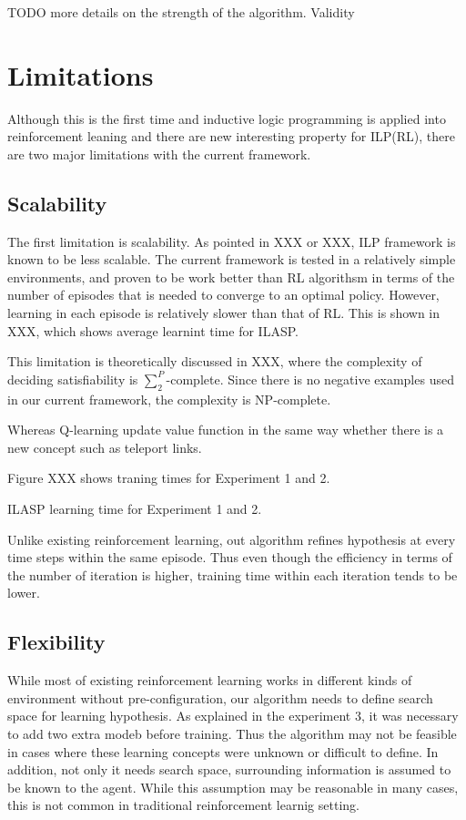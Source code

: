 TODO more details on the strength of the algorithm. 
Validity

\section{Limitations}

Although this is the first time and inductive logic programming is applied into reinforcement leaning and there are new interesting property for ILP(RL),
there are two major limitations with the current framework.

\subsection{Scalability}
The first limitation is scalability. As pointed in XXX or XXX,
ILP framework is known to be less scalable. The current framework is tested in a relatively simple environments, 
and proven to be work better than RL algorithsm in terms of the number of episodes that is needed to converge to an optimal policy.
However, learning in each episode is relatively slower than that of RL. 
This is shown in XXX, which shows average learnint time for ILASP. 

This limitation is theoretically discussed in XXX, where the complexity of deciding satisfiability is 
$\sum_{2}^{P}$-complete. Since there is no negative examples used in our current framework, the complexity is NP-complete.

Whereas Q-learning update value function in the same way whether there is a new concept such as teleport links.

Figure XXX shows traning times for Experiment 1 and 2.

ILASP learning time for Experiment 1 and 2. 

Unlike existing reinforcement learning,
out algorithm refines hypothesis at every time steps within the same episode.
Thus even though the efficiency in terms of the number of iteration is higher,
training time within each iteration tends to be lower.

\subsection{Flexibility}
While most of existing reinforcement learning works in different kinds of environment without pre-configuration, our algorithm
needs to define search space for learning hypothesis. As explained in the experiment 3, it was necessary to add two extra modeb before training.
Thus the algorithm may not be feasible in cases where these learning concepts were unknown or difficult to define. 
In addition, not only it needs search space, surrounding information is assumed to be known to the agent. 
While this assumption may be reasonable in many cases, this is not common in traditional reinforcement learnig setting.


